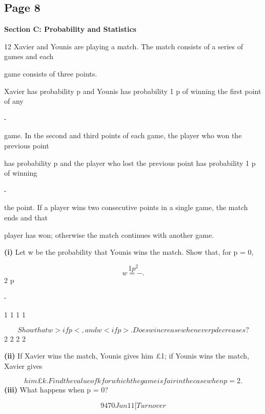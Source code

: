 \documentclass[12pt]{article}
\begin{document}
\subsection*{Page 8}
\begin{flushleft}
\bigskip\textbf{Section C: Probability and Statistics}\par
12 Xavier and Younis are playing a match. The match consists of a series of games and each\par
game consists of three points.\par
Xavier has probability p and Younis has probability 1 p of winning the first point of any\par
-\par
game. In the second and third points of each game, the player who won the previous point\par
has probability p and the player who lost the previous point has probability 1 p of winning\par
-\par
the point. If a player wins two consecutive points in a single game, the match ends and that\par
player has won; otherwise the match continues with another game.\par
\textbf{(i)} Let w be the probability that Younis wins the match. Show that, for p = 0,\par
\[1 p^2\]
\[w = - .\]
2 p\par
-\par
1 1 1 1\par
\[Show that w > if p < , and w < if p > . Does w increase whenever p decreases?\]
2 2 2 2\par
\textbf{(ii)} If Xavier wins the match, Younis gives him \pounds 1; if Younis wins the match, Xavier gives\par
\[him \pounds k. Find the value of k for which the game is fair in the case when p = 2 .\]
\textbf{(iii)} What happens when p = 0?\par
\[9470 Jun11 [Turn over\]
\end{flushleft}
\end{document}
